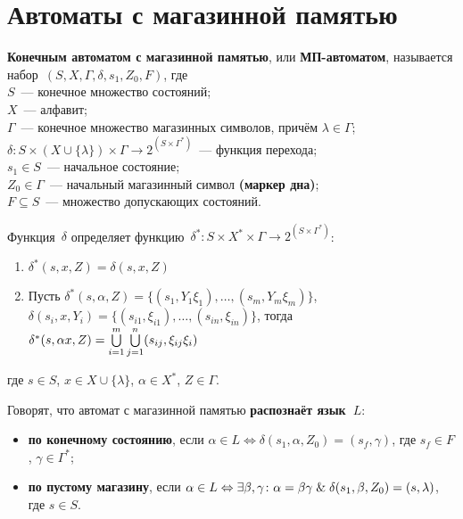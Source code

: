\section{Автоматы с магазинной памятью}
  \textbf{Конечным автоматом с магазинной памятью}, или \textbf{МП-автоматом}, называется набор~$(S, X, \Gamma, \delta, s_1, Z_0, F)$, где\\
$S$~--- конечное множество состояний;\\
$X$~--- алфавит;\\
$\Gamma$~--- конечное множество магазинных символов, причём $\lambda \in \Gamma$;\\
$\delta \colon S \times (X \cup \{ \lambda \}) \times \Gamma \to 2^{(S \times \Gamma^*)}$~--- функция перехода;\\
$s_1 \in S$~--- начальное состояние;\\
$Z_0 \in \Gamma$~--- начальный магазинный символ \textbf{(маркер дна)};\\
$F \subseteq S$~--- множество допускающих состояний.

Функция~$\delta$ определяет функцию~$\delta^* \colon S \times X^* \times \Gamma \to 2^{(S \times \Gamma^*)}$:
\begin{enumerate}
	\item $\delta^*(s, x, Z) = \delta(s, x, Z)$
	\item Пусть $\delta^*(s, \alpha, Z) = \{ (s_1, Y_1 \xi_1), \ldots, (s_m, Y_m \xi_m) \}$,
	$\delta(s_i, x, Y_i) = \{ (s_{i1}, \xi_{i1}), \ldots, (s_{in}, \xi_{in}) \}$,
	тогда
	$\delta^*(s, \alpha x, Z) \opbr= \bigcup\limits_{i=1}^m \bigcup\limits_{j=1}^n (s_{ij}, \xi_{ij} \xi_i)$
\end{enumerate}
где $s \in S$, $x \in X \cup \{ \lambda \}$, $\alpha \in X^*$, $Z \in \Gamma$.

Говорят, что автомат с магазинной памятью \textbf{распознаёт язык~$L$}:
\begin{itemize}
	\item \textbf{по конечному состоянию}, если $\alpha \in L \Leftrightarrow \delta(s_1, \alpha, Z_0) = (s_f, \gamma)$, где $s_f \in F$, $\gamma \in \Gamma^*$;
	\item \textbf{по пустому магазину}, если $\alpha \in L \Leftrightarrow \exists \beta, \gamma \colon \alpha = \beta \gamma \mathrel{\&} \delta(s_1, \beta, Z_0) = (s, \lambda)$, где $s \in S$.
\end{itemize}

